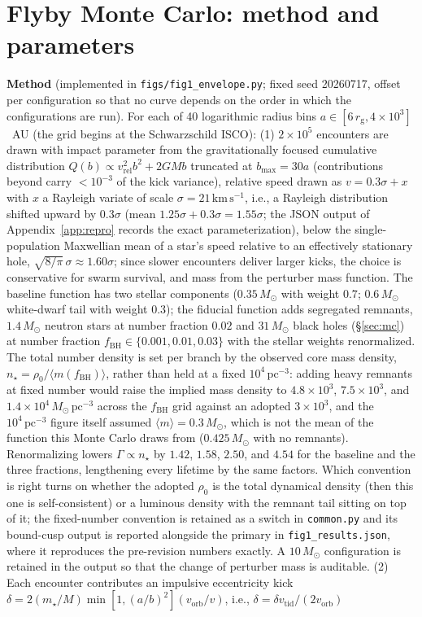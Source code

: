 \documentclass[11pt]{article}
\newcommand{\msun}{\ensuremath{M_\odot}}
\newcommand{\rg}{\ensuremath{r_{\mathrm{g}}}}
\begin{document}
\section{Flyby Monte Carlo: method and parameters}
\label{app:mc}

\textbf{Method} (implemented in \texttt{figs/fig1\_envelope.py}; fixed seed 20260717, offset per configuration so that no curve depends on the order in which the configurations are run). For each of 40 logarithmic radius bins $a \in [6\,\rg, 4\times10^{3}]$~AU (the grid begins at the Schwarzschild ISCO): (1) $2\times10^{5}$ encounters are drawn with impact parameter from the gravitationally focused cumulative distribution $Q(b) \propto v_{\mathrm{rel}}^{2}b^{2} + 2GMb$ truncated at $b_{\max} = 30a$ (contributions beyond carry $<10^{-3}$ of the kick variance), relative speed drawn as $v = 0.3\sigma + x$ with $x$ a Rayleigh variate of scale $\sigma = 21\,\mathrm{km\,s^{-1}}$, i.e., a Rayleigh distribution shifted upward by $0.3\sigma$ (mean $1.25\sigma + 0.3\sigma = 1.55\sigma$; the JSON output of Appendix~\ref{app:repro} records the exact parameterization), below the single-population Maxwellian mean of a star's speed relative to an effectively stationary hole, $\sqrt{8/\pi}\,\sigma \approx 1.60\sigma$; since slower encounters deliver larger kicks, the choice is conservative for swarm survival, and mass from the perturber mass function. The baseline function has two stellar components ($0.35\,\msun$ with weight $0.7$; $0.6\,\msun$ white-dwarf tail with weight $0.3$); the fiducial function adds segregated remnants, $1.4\,\msun$ neutron stars at number fraction $0.02$ and $31\,\msun$ black holes (\S\ref{sec:mc}) at number fraction $f_{\mathrm{BH}} \in \{0.001, 0.01, 0.03\}$ with the stellar weights renormalized. The total number density is set per branch by the observed core mass density, $n_{\star} = \rho_{0}/\langle m(f_{\mathrm{BH}})\rangle$, rather than held at a fixed $10^{4}\,\mathrm{pc^{-3}}$: adding heavy remnants at fixed number would raise the implied mass density to $4.8\times10^{3}$, $7.5\times10^{3}$, and $1.4\times10^{4}\,\msun\,\mathrm{pc^{-3}}$ across the $f_{\mathrm{BH}}$ grid against an adopted $3\times10^{3}$, and the $10^{4}\,\mathrm{pc^{-3}}$ figure itself assumed $\langle m\rangle = 0.3\,\msun$, which is not the mean of the function this Monte Carlo draws from ($0.425\,\msun$ with no remnants). Renormalizing lowers $\Gamma \propto n_{\star}$ by $1.42$, $1.58$, $2.50$, and $4.54$ for the baseline and the three fractions, lengthening every lifetime by the same factors. Which convention is right turns on whether the adopted $\rho_{0}$ is the total dynamical density (then this one is self-consistent) or a luminous density with the remnant tail sitting on top of it; the fixed-number convention is retained as a switch in \texttt{common.py} and its bound-cusp output is reported alongside the primary in \texttt{fig1\_results.json}, where it reproduces the pre-revision numbers exactly. A $10\,\msun$ configuration is retained in the output so that the change of perturber mass is auditable. (2) Each encounter contributes an impulsive eccentricity kick $\delta = 2(m_{\star}/M)\min[1,(a/b)^{2}](v_{\mathrm{orb}}/v)$, i.e., $\delta = \delta v_{\mathrm{tid}}/(2 v_{\mathrm{orb}})$ 
\end{document}
